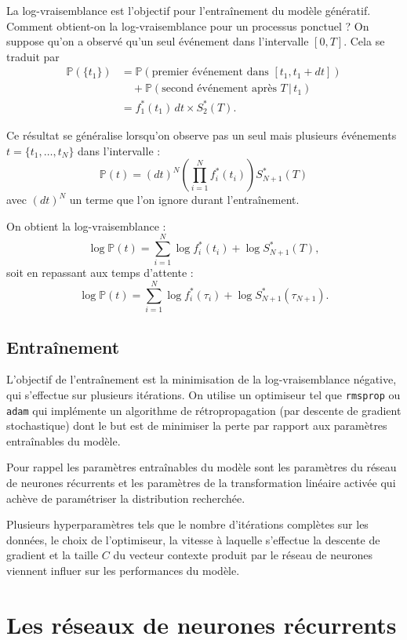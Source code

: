 \documentclass{article}
\theoremstyle{definition}
\theoremstyle{remark}
\begin{document}
La log-vraisemblance est l'objectif pour l'entraînement du modèle génératif.
Comment obtient-on la log-vraisemblance pour un processus ponctuel ?
On suppose qu'on a observé qu'un seul événement dans l'intervalle $[0, T]$.
Cela se traduit par
\begin{align*}
\mathbb{P}(\{t_1\})
& = \mathbb{P}(\text{premier événement dans } [t_1, t_1+dt]) \\
& \quad + \mathbb{P}(\text{second événement après } T \, |\,  t_1) \\
& = f^*_1(t_1)\, dt \times S^*_2(T).
\end{align*}

Ce résultat se généralise lorsqu'on observe pas un seul mais plusieurs
événements $t = \{t_1, \dots, t_N\}$ dans l'intervalle :
$$\mathbb{P}(t) = (dt)^N \left(\prod_{i=1}^N f^*_i(t_i)\right)
S^*_{N+1}(T)$$ avec $(dt)^N$ un terme que l'on ignore durant l'entraînement.

On obtient la log-vraisemblance :
$$\log \mathbb{P}(t) = \sum_{i=1}^N \log f^*_i(t_i) + \log S^*_{N+1}(T),$$
soit en repassant aux temps d'attente :
$$\log \mathbb{P}(t) = \sum_{i=1}^N \log f^*_i(\tau_i)
+ \log S^*_{N+1}(\tau_{N+1}).$$

\subsection{Entraînement}

L'objectif de l'entraînement est la minimisation de 
la log-vraisemblance négative, qui s'effectue sur plusieurs itérations.
On utilise un optimiseur tel que \verb|rmsprop| ou \verb|adam| qui implémente
un algorithme de rétropropagation (par descente de gradient stochastique)
dont le but est de minimiser la perte par rapport aux paramètres entraînables
du modèle.

Pour rappel les paramètres entraînables du modèle sont les paramètres
du réseau de neurones récurrents et les paramètres de la transformation
linéaire activée qui achève de paramétriser la distribution recherchée.

Plusieurs hyperparamètres tels que le nombre d'itérations complètes sur les
données, le choix de l'optimiseur, la vitesse à laquelle s'effectue la
descente de gradient et la taille $C$ du vecteur contexte produit par le
réseau de neurones viennent influer sur les performances du modèle.

\section{Les réseaux de neurones récurrents}



\nocite{*}

\printbibliography
\end{document}
